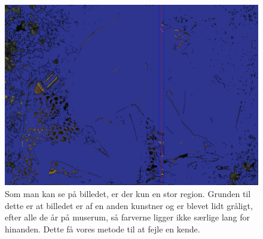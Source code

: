 \begin{figure}[h!!]
	\begin{center}
		\includegraphics[scale=0.20,angle=0]{afsnit/afprovning/billeder/nicofloodfillbilledet.png}
	\end{center}
	\caption[]{Som man kan se på billedet, er der kun en stor region.
	           Grunden til dette er at billedet er af en anden kunstner
	           og er blevet lidt gråligt, efter alle de år på muserum,
	           så farverne ligger ikke særlige lang for hinanden. Dette
	           få vores metode til at fejle en kende.}
	\label{nicofill}
\end{figure}

